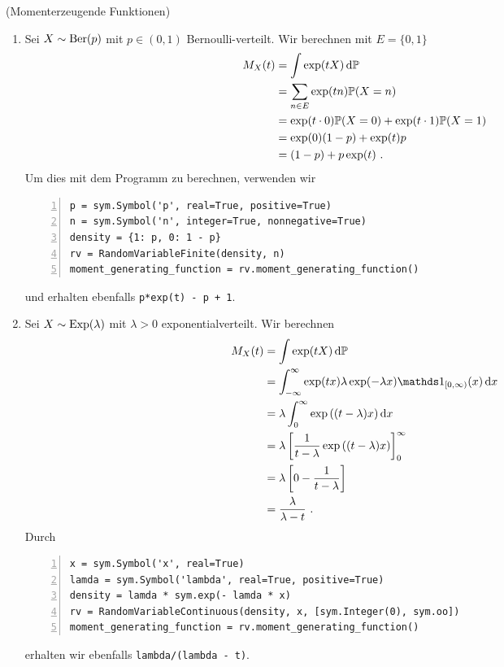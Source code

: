 \begin{Beispiel}{(Momenterzeugende Funktionen)}
\hypertarget{Bsp:Moment_Erz}{}
\begin{enumerate}[label=(\roman*)]
\item Sei $X \sim \operatorname{Ber}(p)$ mit $p \in (0, 1)$ Bernoulli-verteilt. Wir berechnen mit $E = \{0, 1\}$
\begin{align*}
M_X(t) &= \int \exp(t X) \mathop{}\!\mathrm{d} \mathbb{P}\\
&= \sum_{n \in E} \exp(t n) \mathbb{P}(X = n)\\
&= \exp(t \cdot 0) \mathbb{P}(X = 0) + \exp(t \cdot 1) \mathbb{P}(X = 1)\\
&= \exp(0) (1 - p) + \exp(t) p\\
&= (1 - p) + p \exp(t)~.
\end{align*}
Um dies mit dem Programm zu berechnen, verwenden wir
\begin{lstlisting}[numbers=left, numberstyle=\tiny\color{codegray}]
p = sym.Symbol('p', real=True, positive=True)
n = sym.Symbol('n', integer=True, nonnegative=True)
density = {1: p, 0: 1 - p}
rv = RandomVariableFinite(density, n)
moment_generating_function = rv.moment_generating_function()
\end{lstlisting}
und erhalten ebenfalls \lstinline|p*exp(t) - p + 1|.

\item Sei $X \sim \operatorname{Exp}(\lambda)$ mit $\lambda > 0$ exponentialverteilt. Wir berechnen
\begin{align*}
M_X(t) &= \int \exp(t X) \d \mathbb{P}\\
&= \int_{-\infty}^\infty \exp(t x) \lambda \exp(- \lambda x) \indi_{[0, \infty)}(x) \d x\\
&= \lambda \int_0^\infty  \exp\left( (t - \lambda) x \right) \d x\\
&= \lambda \left[ \frac{1}{t - \lambda} \exp\left( (t - \lambda) x \right) \right]_0^\infty\\
&= \lambda \left[ 0 - \frac{1}{t - \lambda} \right]\\
&= \frac{\lambda}{\lambda - t}~.
\end{align*}
Durch
\begin{lstlisting}[numbers=left, numberstyle=\tiny\color{codegray}]
x = sym.Symbol('x', real=True)
lamda = sym.Symbol('lambda', real=True, positive=True)
density = lamda * sym.exp(- lamda * x)
rv = RandomVariableContinuous(density, x, [sym.Integer(0), sym.oo])
moment_generating_function = rv.moment_generating_function()
\end{lstlisting}
erhalten wir ebenfalls \lstinline|lambda/(lambda - t)|.


\end{enumerate}
\end{Beispiel}
